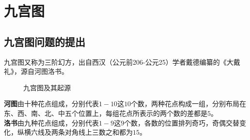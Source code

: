 \documentclass[openany]{progbookcn}
\begin{document}
\section{九宫图}
\subsection{九宫图问题的提出}
九宫图又称为三阶幻方，出自西汉（公元前206-公元25）学者戴德编纂的《大戴礼》，源自河图洛书。
\begin{figure}[H]
\centering  %
\caption{九宫图及其起源}
\end{figure}
\indent \textbf{河图}由十种花点组成，分别代表$1-10$这$10$个数，两种花点构成一组，分别布局在东、西、南、北、中五个位置上，每组花点所表示的两个数的差都是$5$。\\
\indent \textbf{洛书}由九种花点组成，分别代表$1-9$这$9$个数，各数的位置排列奇巧，奇偶交替变化，纵横六线及两条对角线上三数之和都为$15$。
\end{document}

